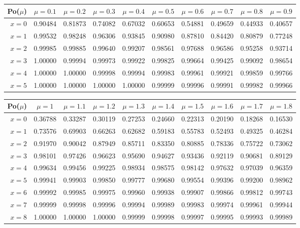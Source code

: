\begin{tabular}{r|ccccccccc}
Po($\mu$)& $\mu=0.1$ & $\mu=0.2$ & $\mu=0.3$ & $\mu=0.4$ & $\mu=0.5$ & $\mu=0.6$ & $\mu=0.7$ & $\mu=0.8$ & $\mu=0.9$ \\\hline
$x= 0$&0.90484&0.81873&0.74082&0.67032&0.60653&0.54881&0.49659&0.44933&0.40657\\
$x= 1$&0.99532&0.98248&0.96306&0.93845&0.90980&0.87810&0.84420&0.80879&0.77248\\
$x= 2$&0.99985&0.99885&0.99640&0.99207&0.98561&0.97688&0.96586&0.95258&0.93714\\
$x= 3$&1.00000&0.99994&0.99973&0.99922&0.99825&0.99664&0.99425&0.99092&0.98654\\
$x= 4$&1.00000&1.00000&0.99998&0.99994&0.99983&0.99961&0.99921&0.99859&0.99766\\
$x= 5$&1.00000&1.00000&1.00000&1.00000&0.99999&0.99996&0.99991&0.99982&0.99966\\

\end{tabular}

\vspace{8pt minus 6pt}
\begin{tabular}{r|ccccccccc}
Po($\mu$)& $\mu=1$ & $\mu=1.1$ & $\mu=1.2$ & $\mu=1.3$ & $\mu=1.4$ & $\mu=1.5$ & $\mu=1.6$ & $\mu=1.7$ & $\mu=1.8$ \\\hline
$x= 0$&0.36788&0.33287&0.30119&0.27253&0.24660&0.22313&0.20190&0.18268&0.16530\\
$x= 1$&0.73576&0.69903&0.66263&0.62682&0.59183&0.55783&0.52493&0.49325&0.46284\\
$x= 2$&0.91970&0.90042&0.87949&0.85711&0.83350&0.80885&0.78336&0.75722&0.73062\\
$x= 3$&0.98101&0.97426&0.96623&0.95690&0.94627&0.93436&0.92119&0.90681&0.89129\\
$x= 4$&0.99634&0.99456&0.99225&0.98934&0.98575&0.98142&0.97632&0.97039&0.96359\\
$x= 5$&0.99941&0.99903&0.99850&0.99777&0.99680&0.99554&0.99396&0.99200&0.98962\\
$x= 6$&0.99992&0.99985&0.99975&0.99960&0.99938&0.99907&0.99866&0.99812&0.99743\\
$x= 7$&0.99999&0.99998&0.99996&0.99994&0.99989&0.99983&0.99974&0.99961&0.99944\\
$x= 8$&1.00000&1.00000&1.00000&0.99999&0.99998&0.99997&0.99995&0.99993&0.99989\\

\end{tabular}

